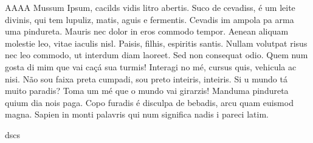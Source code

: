 

\begin{myquote}
AAAA Mussum Ipsum, cacilds vidis litro abertis.  Suco de cevadiss, é um leite
divinis, qui tem lupuliz, matis, aguis e fermentis. Cevadis im ampola
pa arma uma pindureta. Mauris nec dolor in eros commodo tempor. Aenean
aliquam molestie leo, vitae iaculis nisl. Paisis, filhis, espiritis
santis. Nullam volutpat risus nec leo commodo, ut interdum diam
laoreet. Sed non consequat odio. Quem num gosta di mim que vai caçá
sua turmis! Interagi no mé, cursus quis, vehicula ac nisi. Não sou
faixa preta cumpadi, sou preto inteiris, inteiris. Si u mundo tá muito
paradis? Toma um mé que o mundo vai girarzis! Manduma pindureta quium
dia nois paga. Copo furadis é disculpa de bebadis, arcu quam euismod
magna. Sapien in monti palavris qui num significa nadis i pareci latim.
\end{myquote}

\begin{boxlist}
\itembox dscs
\end{boxlist}